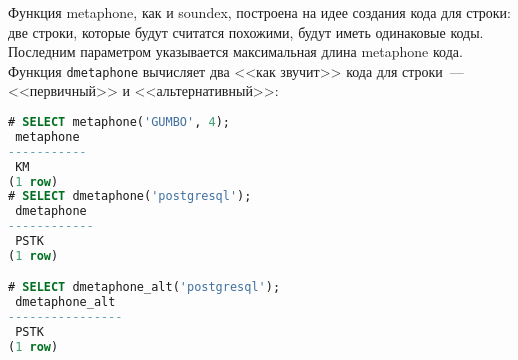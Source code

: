Функция metaphone, как и soundex, построена на идее создания кода для строки: две строки, которые будут считатся похожими, будут иметь одинаковые коды. Последним параметром указывается максимальная длина metaphone кода. Функция \lstinline!dmetaphone! вычисляет два <<как звучит>> кода для строки~--- <<первичный>> и <<альтернативный>>:

\begin{lstlisting}[language=SQL,label=lst:ext_fuzzystrmatch3,caption=metaphone]
# SELECT metaphone('GUMBO', 4);
 metaphone
-----------
 KM
(1 row)
# SELECT dmetaphone('postgresql');
 dmetaphone
------------
 PSTK
(1 row)

# SELECT dmetaphone_alt('postgresql');
 dmetaphone_alt
----------------
 PSTK
(1 row)
\end{lstlisting}

